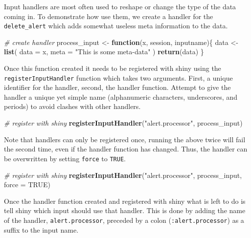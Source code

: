 \documentclass[
]{krantz}
\makeatletter
\newenvironment{Shaded}{\begin{snugshade}}{\end{snugshade}}
\newcommand{\CommentTok}[1]{\textcolor[rgb]{0.37,0.37,0.37}{\textit{#1}}}
\newcommand{\ControlFlowTok}[1]{\textcolor[rgb]{0.27,0.27,0.27}{\textbf{#1}}}
\newcommand{\DataTypeTok}[1]{\textcolor[rgb]{0.27,0.27,0.27}{#1}}
\newcommand{\KeywordTok}[1]{\textcolor[rgb]{0.27,0.27,0.27}{\textbf{#1}}}
\newcommand{\NormalTok}[1]{#1}
\newcommand{\OtherTok}[1]{\textcolor[rgb]{0.37,0.37,0.37}{#1}}
\newcommand{\StringTok}[1]{\textcolor[rgb]{0.5,0.5,0.5}{#1}}
\newenvironment{kframe}{%
\medskip{}
\setlength{\fboxsep}{.8em}
 \def\at@end@of@kframe{}%
 \ifinner\ifhmode%
  \def\at@end@of@kframe{\end{minipage}}%
  \begin{minipage}{\columnwidth}%
 \fi\fi%
 \def\FrameCommand##1{\hskip\@totalleftmargin \hskip-\fboxsep
 \colorbox{shadecolor}{##1}\hskip-\fboxsep
     \hskip-\linewidth \hskip-\@totalleftmargin \hskip\columnwidth}%
 \MakeFramed {\advance\hsize-\width
   \@totalleftmargin\z@ \linewidth\hsize
   \@setminipage}}%
 {\par\unskip\endMakeFramed%
 \at@end@of@kframe}
\renewenvironment{Shaded}{\begin{kframe}}{\end{kframe}}
\makeatother
\begin{document}
Input handlers are most often used to reshape or change the type of the data coming in. To demonstrate how use them, we create a handler for the \texttt{delete\_alert} which adds somewhat useless meta information to the data.

\begin{Shaded}
\begin{Highlighting}[]
\CommentTok{\# create handler}
\NormalTok{process\_input \textless{}{-}}\StringTok{ }\ControlFlowTok{function}\NormalTok{(x, session, inputname)\{}
\NormalTok{  data \textless{}{-}}\StringTok{ }\KeywordTok{list}\NormalTok{(}
    \DataTypeTok{data =}\NormalTok{ x,}
    \DataTypeTok{meta =} \StringTok{"This is some meta{-}data"}
\NormalTok{  )}
  \KeywordTok{return}\NormalTok{(data)}
\NormalTok{\}}
\end{Highlighting}
\end{Shaded}

Once this function created it needs to be registered with shiny using the \texttt{registerInputHandler} function which takes two arguments. First, a unique identifier for the handler, second, the handler function. Attempt to give the handler a unique yet simple name (alphanumeric characters, underscores, and periods) to avoid clashes with other handlers.

\begin{Shaded}
\begin{Highlighting}[]
\CommentTok{\# register with shiny}
\KeywordTok{registerInputHandler}\NormalTok{(}\StringTok{"alert.processor"}\NormalTok{, process\_input)}
\end{Highlighting}
\end{Shaded}

Note that handlers can only be registered once, running the above twice will fail the second time, even if the handler function has changed. Thus, the handler can be overwritten by setting \texttt{force} to \texttt{TRUE}.

\begin{Shaded}
\begin{Highlighting}[]
\CommentTok{\# register with shiny}
\KeywordTok{registerInputHandler}\NormalTok{(}\StringTok{"alert.processor"}\NormalTok{, process\_input, }\DataTypeTok{force =} \OtherTok{TRUE}\NormalTok{)}
\end{Highlighting}
\end{Shaded}

Once the handler function created and registered with shiny what is left to do is tell shiny which input should use that handler. This is done by adding the name of the handler, \texttt{alert.processor}, preceded by a colon (\texttt{:alert.processor}) as a suffix to the input name.
\end{document}
